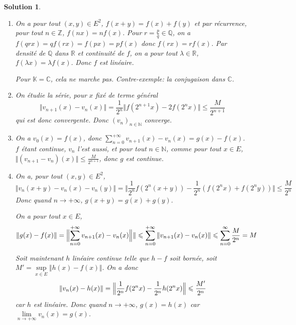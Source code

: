 \documentclass[12pt]{article}
\newtheorem{solution}{Solution}[section]
\theoremstyle{remark}
\newcommand{\K}{\mathbb{K}} \newcommand{\R}{\mathbb{R}}
\newcommand{\C}{\mathbb{C}} \newcommand{\Q}{\mathbb{Q}}
\newcommand{\N}{\mathbb{N}} \newcommand{\Z}{\mathbb{Z}}
\numberwithin{equation}{section}
\begin{document}
\begin{solution}
	\phantom{}
	\begin{enumerate}
		\item On a pour tout $(x,y)\in E^{2}$, $f(x+y)=f(x)+f(y)$ et par récurrence, pour tout $n\in\Z$, $f(nx)=nf(x)$. Pour $r=\frac{p}{q}\in\Q$, on a $f(qrx)=qf(rx)=f(px)=pf(x)$ donc $f(rx)=rf(x)$. Par densité de $\Q$ dans $\R$ et continuité de $f$, on a pour tout $\lambda\in\R$, $f(\lambda x)=\lambda f(x)$. Donc $f$ est linéaire.
		
		Pour $\K=\C$, cela ne marche pas. Contre-exemple: la conjugaison dans $\C$.

		\item On étudie la série, pour $x$ fixé de terme général 
		$$\Vert v_{n+1}(x)-v_{n}(x)\Vert=\frac{1}{2^{n}}\Vert f(2^{n+1}x)-2f(2^{n}x)\Vert\leqslant\frac{M}{2^{n+1}}$$
		qui est donc convergente. Donc $(v_{n})_{n\in\N}$ converge.

		\item On a $v_{0}(x)=f(x)$, donc $\sum_{n=0}^{+\infty}v_{n+1}(x)-v_{n}(x)=g(x)-f(x)$. $f$ étant continue, $v_{n}$ l'est aussi, et pour tout $n\in\N$, comme pour tout $x\in E$, $\Vert (v_{n+1}-v_{n})(x)\Vert\leqslant\frac{M}{2^{n+1}}$, donc $g$ est continue.
		
		\item On a, pour tout $(x,y)\in E^{2}$,
		$$\Vert v_{n}(x+y)-v_{n}(x)-v_{n}(y)\Vert=\Vert \frac{1}{2^{n}}f(2^{n}(x+y))-\frac{1}{2^{n}}(f(2^{n}x)+f(2^{n}y))\Vert\leqslant\frac{M}{2^{n}}$$
		Donc quand $n\to+\infty$, $g(x+y)=g(x)+g(y)$.

		On a pour tout $x\in E$, 
		$$\Vert g(x)-f(x)\Vert=\Bigl\lVert\sum_{n=0}^{+\infty}v_{n+1}(x)-v_{n}(x)\Bigr\Vert\rVert\leqslant\sum_{n=0}^{+\infty}\Vert v_{n+1}(x)-v_{n}(x)\Vert\leqslant\sum_{n=0}^{\infty}\frac{M}{2^{n}}=M$$

		Soit maintenant $h$ linéaire continue telle que $h-f$ soit bornée, soit $M'=\sup\limits_{x\in E}\Vert h(x)-f(x)\Vert$. On a donc 
		$$\Vert v_{n}(x)-h(x)\Vert=\Bigl\Vert\frac{1}{2^{n}}f(2^{n}x)-\frac{1}{2^{n}}h(2^{n}x)\Bigr\Vert\leqslant\frac{M'}{2^{n}}$$
		car $h$ est linéaire. Donc quand $n\to+\infty$, $g(x)=h(x)$ car $\lim\limits_{n\to+\infty}v_{n}(x)=g(x)$.
	\end{enumerate}
\end{solution}
\end{document}
